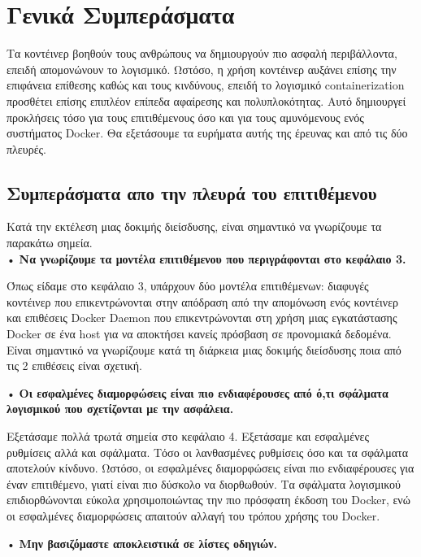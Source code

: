 \chapter{Γενικά Συμπεράσματα}
\label{conclusions}

Τα κοντέινερ βοηθούν τους ανθρώπους να δημιουργούν πιο ασφαλή περιβάλλοντα,
επειδή απομονώνουν το λογισμικό. Ωστόσο, η χρήση κοντέινερ αυξάνει επίσης την
επιφάνεια επίθεσης καθώς και τους κινδύνους, επειδή το λογισμικό
\textlatin{containerization} προσθέτει επίσης επιπλέον επίπεδα αφαίρεσης και
πολυπλοκότητας. Αυτό δημιουργεί προκλήσεις τόσο για τους επιτιθέμενους όσο και
για τους αμυνόμενους ενός συστήματος \textlatin{Docker}. Θα εξετάσουμε τα
ευρήματα αυτής της έρευνας και από τις δύο πλευρές.

\section{Συμπεράσματα απο την πλευρά του επιτιθέμενου}

Κατά την εκτέλεση μιας δοκιμής διείσδυσης, είναι σημαντικό να γνωρίζουμε τα
παρακάτω σημεία. \\

• \textbf{Να γνωρίζουμε τα μοντέλα επιτιθέμενου που περιγράφονται στο κεφάλαιο
3.}

Όπως είδαμε στο κεφάλαιο 3, υπάρχουν δύο μοντέλα επιτιθέμενων: διαφυγές
κοντέινερ που επικεντρώνονται στην απόδραση από την απομόνωση ενός κοντέινερ και
επιθέσεις \textlatin{Docker Daemon} που επικεντρώνονται στη χρήση μιας
εγκατάστασης \textlatin{Docker} σε ένα \textlatin{host} για να αποκτήσει
κανείς πρόσβαση σε προνομιακά δεδομένα. Είναι σημαντικό να γνωρίζουμε κατά τη
διάρκεια μιας δοκιμής διείσδυσης ποια από τις 2 επιθέσεις είναι σχετική.

• \textbf{Οι εσφαλμένες διαμορφώσεις είναι πιο ενδιαφέρουσες από ό,τι
σφάλματα λογισμικού που σχετίζονται με την ασφάλεια.}

Εξετάσαμε πολλά τρωτά σημεία στο κεφάλαιο 4. Εξετάσαμε και εσφαλμένες ρυθμίσεις
αλλά και σφάλματα. Τόσο οι λανθασμένες ρυθμίσεις όσο και τα σφάλματα
αποτελούν κίνδυνο. Ωστόσο, οι εσφαλμένες διαμορφώσεις είναι πιο ενδιαφέρουσες
για έναν επιτιθέμενο, γιατί είναι πιο δύσκολο να διορθωθούν. Τα σφάλματα
λογισμικού επιδιορθώνονται εύκολα χρησιμοποιώντας την πιο πρόσφατη έκδοση του
\textlatin{Docker}, ενώ οι εσφαλμένες διαμορφώσεις απαιτούν αλλαγή του τρόπου
χρήσης του \textlatin{Docker}.

• \textbf{Μην βασιζόμαστε αποκλειστικά σε λίστες οδηγιών.}

